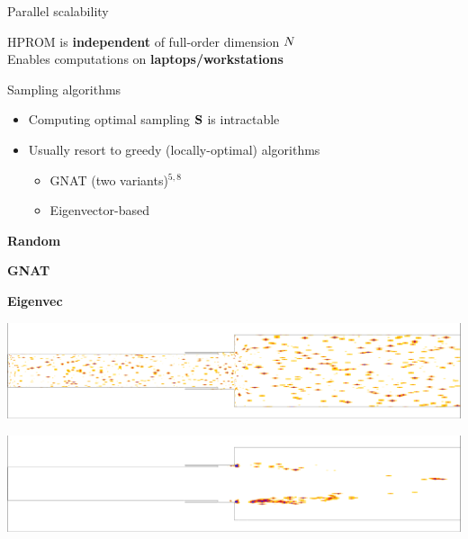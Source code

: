 \documentclass[]{beamer}
\begin{document}
\begin{frame}{Parallel scalability}
\begin{figure}
\begin{minipage}{0.4\linewidth}
		\end{minipage}
	\end{figure}
	\begin{tcolorbox}[colframe=blue!50!white,halign=center]
		HPROM is \textbf{independent} of full-order dimension $N$ \\
		Enables computations on \textbf{laptops/workstations} 
	\end{tcolorbox}
\end{frame}

\begin{frame}{Sampling algorithms}
    \begin{itemize}
		\item Computing optimal sampling $\mathbf{S}$ is intractable
		\item Usually resort to greedy (locally-optimal) algorithms
		\begin{itemize}
			\item GNAT (two variants)$^{5,8}$
			\item Eigenvector-based\footnotemark[8]
		\end{itemize}
	\end{itemize}
	\vspace{-1em}
	\begin{minipage}{0.13\linewidth}
		\footnotesize
		\vspace{3.9em}
		\textbf{Random}
		\normalsize

		\vspace{3em}

		\footnotesize
		\textbf{GNAT}

		\vspace{3.7em}

		\footnotesize
		\textbf{Eigenvec}

		\vspace{4em}
	\end{minipage}
	\centering
	\begin{minipage}{0.8\linewidth}%
		\includegraphics[width=0.85\linewidth,trim={0.2em 2em 0.3em 2em},clip]{Images/theory/iblanks/random_iblank_z.png}

		\includegraphics[width=0.85\linewidth,trim={0.2em 2em 0.3em 2em},clip]{Images/theory/iblanks/greedy_ben_iblank_z.png}


\end{minipage}
\end{frame}
\end{document}
